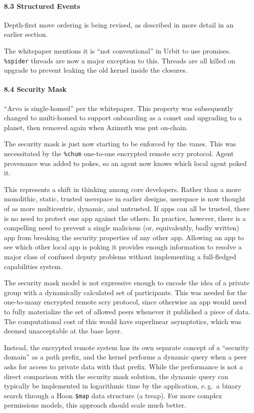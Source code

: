 \documentclass[twoside]{article}
\begin{document}
\paragraph{8.3 Structured Events}  Depth-first move ordering is being revised, as described in more detail in an earlier section.

The whitepaper mentions it is ``not conventional'' in Urbit to use promises.  \lstinline[style=inlinecode]{%spider} threads are now a major exception to this.  Threads are all killed on upgrade to prevent leaking the old kernel inside the closures.

\paragraph{8.4 Security Mask}  ``Arvo is single-homed'' per the whitepaper.  This property was subsequently changed to multi-homed to support onboarding as a comet and upgrading to a planet, then removed again when Azimuth was put on-chain.

The security mask is just now starting to be enforced by the vanes.  This was necessitated by the \lstinline[style=inlinecode]{%chum} one-to-one encrypted remote scry protocol.  Agent provenance was added to pokes, so an agent now knows which local agent poked it.

This represents a shift in thinking among core developers.  Rather than a more monolithic, static, trusted userspace in earlier designs, userspace is now thought of as more multicentric, dynamic, and untrusted.  If apps can all be trusted, there is no need to protect one app against the others.  In practice, however, there is a compelling need to prevent a single malicious (or, equivalently, badly written) app from breaking the security properties of any other app.  Allowing an app to see which other local app is poking it provides enough information to resolve a major class of confused deputy problems without implementing a full-fledged capabilities system.

The security mask model is not expressive enough to encode the idea of a private group with a dynamically calculated set of participants.  This was needed for the one-to-many encrypted remote scry protocol, since otherwise an app would need to fully materialize the set of allowed peers whenever it published a piece of data.  The computational cost of this would have superlinear asymptotics, which was deemed unacceptable at the base layer.

Instead, the encrypted remote system has its own separate concept of a ``security domain'' as a path prefix, and the kernel performs a dynamic query when a peer asks for access to private data with that prefix.  While the performance is not a direct comparison with the security mask solution, the dynamic query can typically be implemented in logarithmic time by the application, e.\,g.\ a binary search through a Hoon \lstinline[style=inlinecode]{$map} data structure (a treap).  For more complex permissions models, this approach should scale much better.
\end{document}
